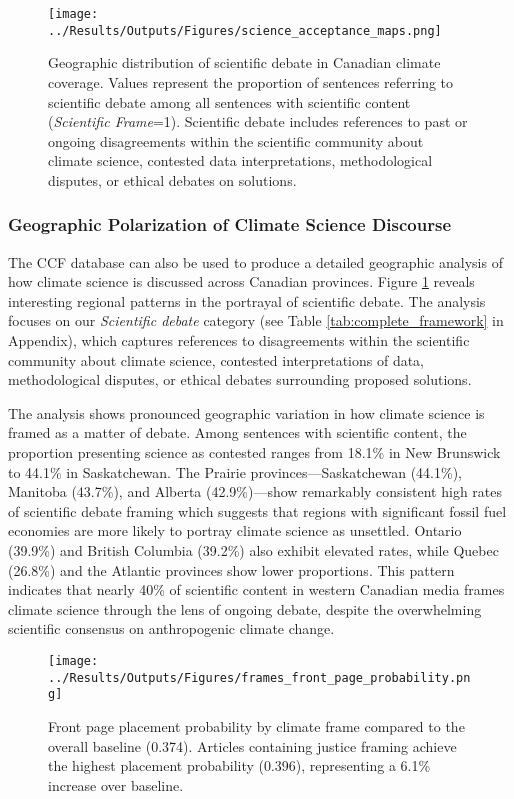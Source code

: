 \documentclass[12pt]{article}
\begin{document}
\begin{figure}[!b]
\centering
\texttt{[image: ../Results/Outputs/Figures/science\_acceptance\_maps.png]}
\caption{Geographic distribution of scientific debate in Canadian climate coverage. Values represent the proportion of sentences referring to scientific debate among all sentences with scientific content (\emph{Scientific Frame}=1). Scientific debate includes references to past or ongoing disagreements within the scientific community about climate science, contested data interpretations, methodological disputes, or ethical debates on solutions.}
\label{fig:science_acceptance}
\end{figure}

\subsubsection{Geographic Polarization of Climate Science Discourse}

The CCF database can also be used to produce a detailed geographic analysis of how climate science is discussed across Canadian provinces. Figure \ref{fig:science_acceptance} reveals interesting regional patterns in the portrayal of scientific debate. The analysis focuses on our \emph{Scientific debate} category (see Table \ref{tab:complete_framework} in Appendix), which captures references to disagreements within the scientific community about climate science, contested interpretations of data, methodological disputes, or ethical debates surrounding proposed solutions.

The analysis shows pronounced geographic variation in how climate science is framed as a matter of debate. Among sentences with scientific content, the proportion presenting science as contested ranges from 18.1\% in New Brunswick to 44.1\% in Saskatchewan. The Prairie provinces—Saskatchewan (44.1\%), Manitoba (43.7\%), and Alberta (42.9\%)—show remarkably consistent high rates of scientific debate framing which suggests that regions with significant fossil fuel economies are more likely to portray climate science as unsettled. Ontario (39.9\%) and British Columbia (39.2\%) also exhibit elevated rates, while Quebec (26.8\%) and the Atlantic provinces show lower proportions. This pattern indicates that nearly 40\% of scientific content in western Canadian media frames climate science through the lens of ongoing debate, despite the overwhelming scientific consensus on anthropogenic climate change. 

\begin{figure}[b!]
\centering
\texttt{[image: ../Results/Outputs/Figures/frames\_front\_page\_probability.png]}
\caption{Front page placement probability by climate frame compared to the overall baseline (0.374). Articles containing justice framing achieve the highest placement probability (0.396), representing a 6.1\% increase over baseline.}
\label{fig:frames_front_page}
\end{figure}
\end{document}
